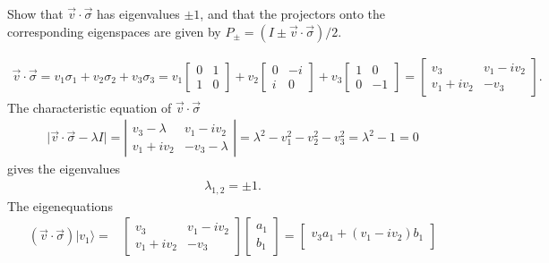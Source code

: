 \documentclass[en]{sol-man}
\begin{document}
\begin{exe}
    Show that $\vec{v}\cdot\vec{\sigma}$ has eigenvalues $\pm 1$, and that the projectors onto the corresponding eigenspaces are given by $P_{\pm}=(I\pm\vec{v}\cdot\vec{\sigma})/2$.
\end{exe}
\begin{pf}
    \begin{align}
        \vec{v}\cdot\vec{\sigma}=v_1\sigma_1+v_2\sigma_2+v_3\sigma_3=v_1\begin{bmatrix}
            0&1\\
            1&0
        \end{bmatrix}+v_2\begin{bmatrix}
            0&-i\\
            i&0
        \end{bmatrix}+v_3\begin{bmatrix}
            1&0\\
            0&-1
        \end{bmatrix}=\begin{bmatrix}
            v_3&v_1-iv_2\\
            v_1+iv_2&-v_3
        \end{bmatrix}.
    \end{align}
    The characteristic equation of $\vec{v}\cdot\vec{\sigma}$
    \begin{align}
        \lvert\vec{v}\cdot\vec{\sigma}-\lambda I\rvert=\left\lvert\begin{matrix}
            v_3-\lambda&v_1-iv_2\\
            v_1+iv_2&-v_3-\lambda
        \end{matrix}\right\rvert=\lambda^2-v_1^2-v_2^2-v_3^2=\lambda^2-1=0
    \end{align}
    gives the eigenvalues
    \begin{align}
        \lambda_{1,2}=\pm 1.
    \end{align}
    The eigenequations
    \begin{align}
        (\vec{v}\cdot\vec{\sigma})\lvert v_1\rangle=&\begin{bmatrix}
            v_3&v_1-iv_2\\
            v_1+iv_2&-v_3
        \end{bmatrix}\begin{bmatrix}
            a_1\\
            b_1
        \end{bmatrix}=\begin{bmatrix}
            v_3a_1+(v_1-iv_2)b_1\\

\end{bmatrix}
\end{align}
\end{pf}
\end{document}
